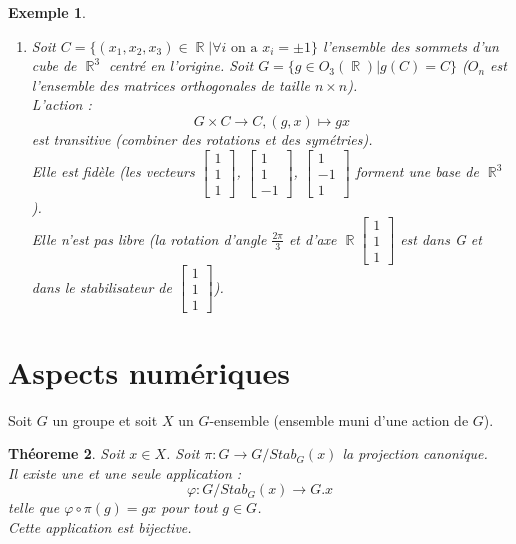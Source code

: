 \documentclass[a4paper, oneside]{report}
\theoremstyle{break}
\newtheorem{thm}{Théoreme}[section] %
\newtheorem{exem}[thm]{Exemple}
\newcommand{\x}{\times}
\DeclareMathOperator{\R}{\mathbb{R}}
\begin{document}
\begin{exem}
\begin{enumerate}
		\item Soit $C=\{(x_1,x_2,x_3) \in \R | \forall i\text{ on a } x_i= \pm 1 \}$ l'ensemble des sommets d'un cube de $\R^3$ centré en l'origine. Soit $G = \{g \in O_3(\R) | g(C)=C \}$ ($O_n$ est l'ensemble des matrices orthogonales de taille $n\x n$).\\
		L'action :
		$$G\x C \rightarrow C, (g,x)\mapsto gx$$
		est transitive (combiner des rotations et des symétries).\\
		Elle est fidèle (les vecteurs $\left[\begin{array}{l}
		1\\
		1\\
		1
		\end{array}\right]$, $\left[\begin{array}{l}
		1\\
		1\\
		-1
		\end{array}\right]$, $\left[\begin{array}{l}
		1\\
		-1\\
		1
		\end{array}\right]$ forment une base de $\R^3$).\\
		Elle n'est pas libre (la rotation d'angle $\frac{2\pi}{3}$ et d'axe $\R \left[\begin{array}{l}
		1\\
		1\\
		1
		\end{array}\right]$ est dans G et dans le stabilisateur de $\left[\begin{array}{l}
		1\\
		1\\
		1
		\end{array}\right]$).
	\end{enumerate}
\end{exem}

\section{Aspects numériques}

Soit $G$ un groupe et soit $X$ un $G$-ensemble (ensemble muni d'une action de $G$).

\begin{thm}
	Soit $x\in X$. Soit $\pi : G \rightarrow G/Stab_G(x)$ la projection canonique.\\
	Il existe une et une seule application :
	$$\varphi : G/Stab_G(x) \rightarrow G.x$$
	telle que $\varphi \circ \pi(g)=gx$ pour tout $g\in G$.\\
	Cette application est bijective.
\end{thm}
\end{document}
